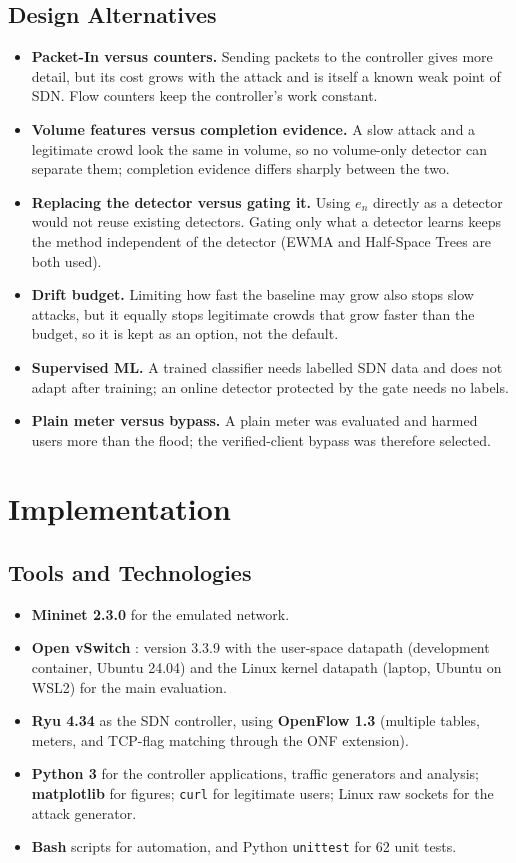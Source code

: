 \documentclass[12pt,a4paper,oneside]{report}
\begin{document}
\section{Design Alternatives}
\begin{itemize}
\item \textbf{Packet-In versus counters.} Sending packets to the controller gives more detail, but its cost grows with the attack and is itself a known weak point of SDN. Flow counters keep the controller's work constant.
\item \textbf{Volume features versus completion evidence.} A slow attack and a legitimate crowd look the same in volume, so no volume-only detector can separate them; completion evidence differs sharply between the two.
\item \textbf{Replacing the detector versus gating it.} Using $e_n$ directly as a detector would not reuse existing detectors. Gating only what a detector learns keeps the method independent of the detector (EWMA and Half-Space Trees are both used).
\item \textbf{Drift budget.} Limiting how fast the baseline may grow also stops slow attacks, but it equally stops legitimate crowds that grow faster than the budget, so it is kept as an option, not the default.
\item \textbf{Supervised ML.} A trained classifier needs labelled SDN data and does not adapt after training; an online detector protected by the gate needs no labels.
\item \textbf{Plain meter versus bypass.} A plain meter was evaluated and harmed users more than the flood; the verified-client bypass was therefore selected.
\end{itemize}

\chapter{Implementation}
\section{Tools and Technologies}
\begin{itemize}
\item \textbf{Mininet 2.3.0} \citep{lantz2010mininet} for the emulated network.
\item \textbf{Open vSwitch} \citep{pfaff2015ovs}: version 3.3.9 with the user-space datapath (development container, Ubuntu 24.04) and the Linux kernel datapath (laptop, Ubuntu on WSL2) for the main evaluation.
\item \textbf{Ryu 4.34} \citep{ryu} as the SDN controller, using \textbf{OpenFlow 1.3} \citep{onf2012of13} (multiple tables, meters, and TCP-flag matching through the ONF extension).
\item \textbf{Python 3} for the controller applications, traffic generators and analysis; \textbf{matplotlib} for figures; \texttt{curl} for legitimate users; Linux raw sockets for the attack generator.
\item \textbf{Bash} scripts for automation, and Python \texttt{unittest} for 62 unit tests.
\end{itemize}
\end{document}
